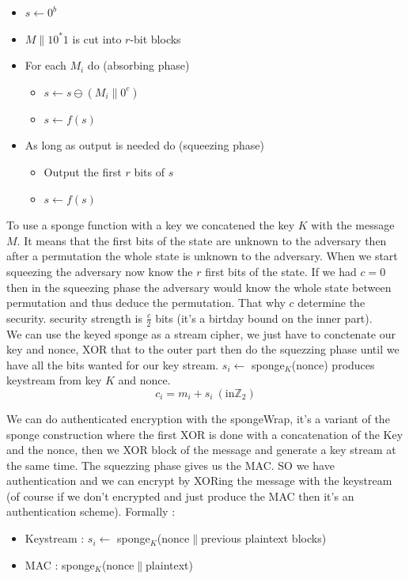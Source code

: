 \documentclass[11pt,a4paper]{report}
\begin{document}
\begin{itemize}
\item $s \leftarrow 0^b$
\item $M \parallel 10^*1$ is cut into $r$-bit blocks
\item For each $M_i$ do (absorbing phase)
\begin{itemize}
\item $s \leftarrow s \ominus (M_i\parallel 0^c)$
\item $s \leftarrow  f(s)$
\end{itemize}
\item As long as output is needed do (squeezing phase)
\begin{itemize}
\item Output the first $r$ bits of $s$
\item $s \leftarrow  f(s)$
\end{itemize}
\end{itemize}
To use a sponge function with a key we concatened the key $K$ with the message $M$. It means that the first bits of the state are unknown to the adversary then after a permutation the whole state is unknown to the adversary. When we start squeezing the adversary now know the $r$ first bits of the state. If we had $c = 0$ then in the squeezing phase the adversary would know the whole state between permutation and thus deduce the permutation. That why $c$ determine the security. security strength is $\frac{c}{2}$ bits (it's a birtday bound on the inner part).\\

We can use the keyed sponge as a stream cipher, we just have to conctenate our key and nonce, XOR that to the outer part then do the squezzing phase until we have all the bits wanted for our key stream. $s_i \leftarrow $ sponge$_K$(nonce) produces keystream from key $K$ and nonce.
$$c_i = m_i + s_i \ (\text{in} \mathbb{Z}_2)$$

We can do authenticated encryption with the spongeWrap, it's a variant of the sponge construction where the first XOR is done with a concatenation of the Key and the nonce, then we XOR block of the message and generate a key stream at the same time. The squezzing phase gives us the MAC. SO we have authentication and we can encrypt by XORing the message with the keystream  (of course if we don't encrypted and just produce the MAC then it's an authentication scheme). Formally :
\begin{itemize}
\item Keystream : $s_i \leftarrow$ sponge$_K$(nonce$\parallel$previous plaintext blocks)
\item MAC : sponge$_K$(nonce$\parallel$plaintext)
\end{itemize}
\end{document}
